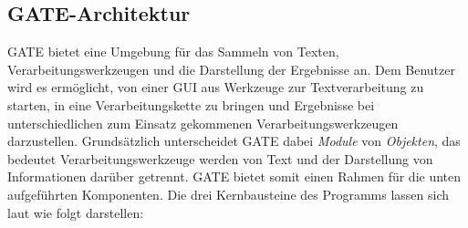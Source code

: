 \documentclass[12pt]{report}
\begin{document}
\subsection{GATE-Architektur}
GATE bietet eine Umgebung für das Sammeln von Texten, Verarbeitungswerkzeugen und die Darstellung der Ergebnisse an. Dem Benutzer wird es ermöglicht, von einer GUI aus Werkzeuge zur Textverarbeitung zu starten, in eine Verarbeitungskette zu bringen und Ergebnisse bei unterschiedlichen zum Einsatz gekommenen Verarbeitungswerkzeugen darzustellen. Grundsätzlich unterscheidet GATE dabei \textit{Module} von \textit{Objekten}, das bedeutet Verarbeitungswerkzeuge werden von Text und der Darstellung von Informationen darüber getrennt. GATE bietet somit einen Rahmen für die unten aufgeführten Komponenten. Die drei Kernbausteine des Programms lassen sich laut \cite{cu02} wie folgt darstellen:
\end{document}
